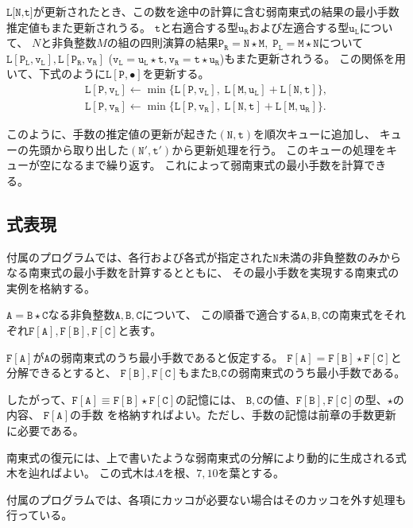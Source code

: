 \documentclass[10pt,dvipdfmx]{ujarticle}
\begin{document}
$\texttt{L[N,t]}$が更新されたとき、この数を途中の計算に含む弱南東式の結果の最小手数推定値もまた更新されうる。
$\mathtt{t}$と右適合する型$\mathtt{u_R}$および左適合する型$\mathtt{u_L}$について、
$N$と非負整数$M$の組の四則演算の結果$\mathtt{P_R}=\mathtt{N}\star \mathtt{M},\;\mathtt{P_L}=\mathtt{M}\star \mathtt{N}$について
$\mathtt{L[P_L,v_L]}, \mathtt{L[P_R,v_R]}$
($\mathtt{v_L}=\mathtt{u_L}\star \mathtt{t}, \mathtt{v_R}=\mathtt{t}\star \mathtt{u_R}$)もまた更新されうる。
この関係を用いて、下式のように$\mathtt{L[P,\bullet]}$を更新する。
\begin{equation}
    \begin{aligned}
        \mathtt{L[P,v_L]}\leftarrow\min\{\mathtt{L[P,v_L]},\;\mathtt{L[M,u_L]}+\mathtt{L[N,t]}\}, \\
        \mathtt{L[P,v_R]}\leftarrow\min\{\mathtt{L[P,v_R]},\;\mathtt{L[N,t]}+\mathtt{L[M,u_R]}\}.
    \end{aligned}
\end{equation}

このように、手数の推定値の更新が起きた$\mathtt{(N,t)}$を順次キューに追加し、
キューの先頭から取り出した$\mathtt{(N',t')}$から更新処理を行う。
このキューの処理をキューが空になるまで繰り返す。
これによって弱南東式の最小手数を計算できる。

\subsection{式表現}
付属のプログラムでは、各行および各式が指定された$\mathtt{N}$未満の非負整数のみからなる南東式の最小手数を計算するとともに、
その最小手数を実現する南東式の実例を格納する。

\newcommand{\FA}[1]{\mathtt{F[#1]}}
$\mathtt{A}=\mathtt{B}\star \mathtt{C}$なる非負整数$\mathtt{A,B,C}$について、
この順番で適合する$\mathtt{A,B,C}$の南東式をそれぞれ$\FA{A}, \FA{B}, \FA{C}$と表す。

$\FA{A}$が$\mathtt{A}$の弱南東式のうち最小手数であると仮定する。
$\FA{A}=\FA{B}\star\FA{C}$と分解できるとすると、
$\FA{B},\FA{C}$もまた$\mathtt{B}$,$\tt C$の弱南東式のうち最小手数である。

したがって、$\FA{A}\equiv \FA B\star\FA C$の記憶には、
$\mathtt{B},\mathtt{C}$の値、$\FA B, \FA C$の型、$\star$の内容、
$\FA{A}$の手数
を格納すればよい。ただし、手数の記憶は前章の手数更新に必要である。

南東式の復元には、上で書いたような弱南東式の分解により動的に生成される式木を辿ればよい。
この式木は$A$を根、$7,10$を葉とする。

付属のプログラムでは、各項にカッコが必要ない場合はそのカッコを外す処理も行っている。
\end{document}
